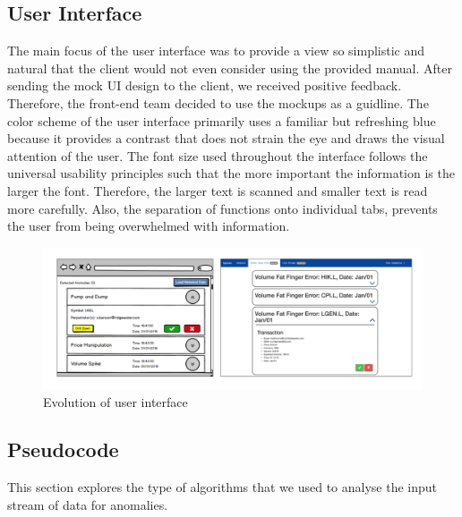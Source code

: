 \documentclass[12pt]{article}
\begin{document}
  \subsection{User Interface}
         The main focus of the user interface was to provide a view so simplistic and natural that the client would not even consider using the provided manual. After sending the mock UI design
         to the client, we received positive feedback. Therefore, the front-end team decided to use the mockups as a guidline.\newline
         The color scheme of the user interface primarily uses a familiar but refreshing blue because it provides a contrast that does not strain the eye and draws the visual attention of the user.
         The font size used throughout the interface follows the universal usability principles such that the more important the information is the larger the font. Therefore, the larger text is scanned
         and smaller text is read more carefully. Also, the separation of functions onto individual tabs, prevents the user from being overwhelmed with information.
         \begin{figure}[H]
         \centering
         \includegraphics[width=170mm]{ui1.png}
         \caption{Evolution of user interface}
         \end{figure}
  \subsection{Pseudocode}
    This section explores the type of algorithms that we used to analyse the input stream of data for anomalies.
\end{document}
